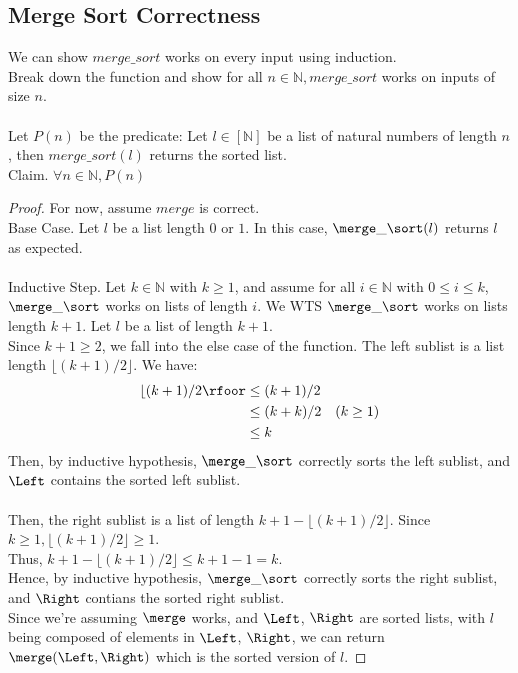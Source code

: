 \documentclass{article}
\begin{document}
\subsection{Merge Sort Correctness}
We can show $merge\_sort$ works on every input using induction.\\
Break down the function and show for all $n \in \mathbb{N}, merge\_sort$ works on inputs of size $n$.\\
\\
Let $P(n)$ be the predicate: Let $l \in [\mathbb{N}]$ be a list of natural numbers of length $n$, then $merge\_sort(l)$ returns the sorted list.\\
Claim. $\forall n \in \mathbb{N}, P(n)$
\begin{proof}
For now, assume $merge$ is correct. \\
Base Case. Let $l$ be a list length $0$ or $1$. In this case, $\merge\_\sort(l)$ returns $l$ as expected.\\
\\
Inductive Step. Let $k \in \mathbb{N}$ with $k \geq 1$, and assume for all $i \in \mathbb{N}$ with $0 \leq i \leq k$, $\merge\_\sort$ works on lists of length $i$. We WTS $\merge\_\sort$ works on lists length $k + 1$. Let $l$ be a list of length $k + 1$.\\
Since $k + 1 \geq 2$, we fall into the else case of the function. The left sublist is a list length $\lfloor(k+1)/2\rfloor$. We have:
\begin{align*}
    \lfloor(k+1)/2\rfoor & \leq (k+1)/2 \\
    & \leq (k + k)/2 & (k \geq 1)\\
    & \leq k
\end{align*}
Then, by inductive hypothesis, $\merge\_\sort$ correctly sorts the left sublist, and $\Left$ contains the sorted left sublist.\\\\
Then, the right sublist is a list of length $k + 1 - \lfloor(k+1)/2\rfloor$. Since $k \geq 1, \lfloor(k+1)/2\rfloor \geq 1$.\\
Thus, $k + 1 - \lfloor(k+1)/2\rfloor \leq k + 1 - 1 = k$.\\
Hence, by inductive hypothesis, $\merge\_\sort$ correctly sorts the right sublist, and $\Right$ contians the sorted right sublist.\\
Since we're assuming $\merge$ works, and $\Left$, $\Right$ are sorted lists, with $l$ being composed of elements in $\Left$, $\Right$, we can return $\merge(\Left, \Right)$ which is the sorted version of $l$.
\end{proof}
\end{document}
